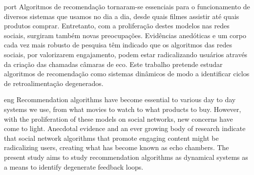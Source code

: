 
\begin{resumo}{port}
Algoritmos de recomendação tornaram-se essenciais para o funcionamento de
diversos sistemas que usamos no dia a dia, desde quais filmes assistir até quais
produtos comprar. Entretanto, com a proliferação destes modelos nas redes
sociais, surgiram também novas preocupações. Evidências anedóticas e um corpo
cada vez mais robusto de pesquisa têm indicado que os algoritmos das redes
sociais, por valorizarem engajamento, podem estar radicalizando usuários através
da criação das chamadas câmaras de eco. Este trabalho pretende estudar
algoritmos de recomendação como sistemas dinâmicos de modo a identificar ciclos
de retroalimentação degenerados.
\end{resumo}

\begin{resumo}{eng}
Recommendation algorithms have become essential to various day to day systems we
use, from what movies to watch to what products to buy. However, with the
proliferation of these models on social networks, new concerns have come to
light. Anecdotal evidence and an ever growing body of research indicate that
social network algorithms that promote engaging content might be radicalizing
users, creating what has become known as echo chambers. The present study aims
to study recommendation algorithms as dynamical systems as a means to identify
degenerate feedback loops.
\end{resumo}
